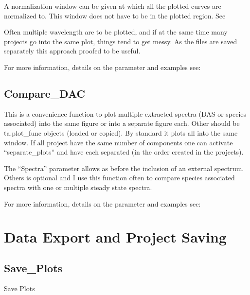 \documentclass[letterpaper,10pt,english]{sphinxmanual}
\begin{document}
A normalization window can be given at which all the plotted curves are normalized to.
This window does not have to be in the plotted region. See {\hyperref[\detokenize{Comparing:normalization-and-scaling}]{}}

Often multiple wavelength are to be plotted, and if at the same time
many projects go into the same plot, things tend to get messy. As the
files are saved separately this approach proofed to be useful.

For more information, details on the parameter and examples see:

{\hyperref[\detokenize{plot_func:plot_func.TA.Compare_at_wave}]{}}


\section{Compare\_DAC}
\label{\detokenize{Comparing:compare-dac}}
This is a convenience function to plot multiple extracted spectra (DAS
or species associated) into the same figure or into a separate figure
each. Other should be ta.plot\_func objects (loaded or copied). By
standard it plots all into the same window. If all project have the same
number of components one can activate “separate\_plots” and have each
separated (in the order created in the projects).

The “Spectra” parameter allows as before the inclusion of an external
spectrum. Others is optional and I use this function often to compare
species associated spectra with one or multiple steady state spectra.

For more information, details on the parameter and examples see:

{\hyperref[\detokenize{plot_func:plot_func.TA.Compare_DAC}]{}}


\chapter{Data Export and Project Saving}
\label{\detokenize{Saving:data-export-and-project-saving}}\label{\detokenize{Saving::doc}}

\section{Save\_Plots}
\label{\detokenize{Saving:save-plots}}
Save Plots                                              {\hyperref[\detokenize{plot_func:plot_func.TA.Save_Plots}]{}}
\end{document}
